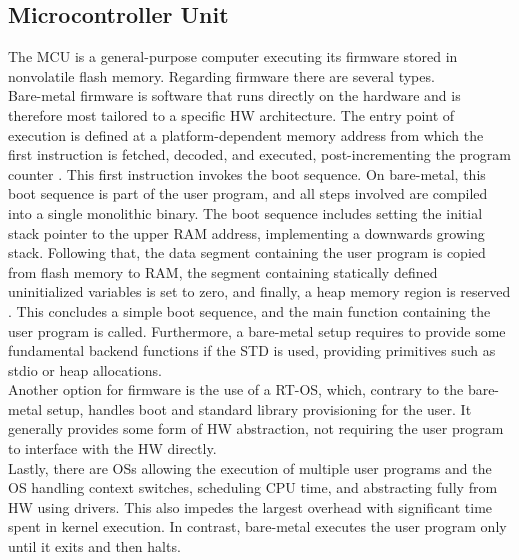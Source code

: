 \documentclass[english]{tudscrartcl}
\begin{document}
		\subsection{Microcontroller Unit}
			\label{sec:bg_mcu}
			The \ac{MCU} is a general-purpose computer executing its firmware stored in nonvolatile flash memory.
			Regarding firmware there are several types.
			\\
			Bare-metal firmware is software that runs directly on the hardware and is therefore most tailored to a specific \ac{HW} architecture.
			The entry point of execution is defined at a platform-dependent memory address from which the first instruction is fetched, decoded, and executed, post-incrementing the program counter \cite{tanenbaum2016structured}.
			This first instruction invokes the boot sequence.
			On bare-metal, this boot sequence is part of the user program, and all steps involved are compiled into a single monolithic binary.
			The boot sequence includes setting the initial stack pointer to the upper \ac{RAM} address, implementing a downwards growing stack.
			Following that, the data segment containing the user program is copied from flash memory to \ac{RAM}, the segment containing statically defined uninitialized variables is set to zero, and finally, a heap memory region is reserved \cite{ARMBMBASICS}.
			This concludes a simple boot sequence, and the main function containing the user program is called.
			Furthermore, a bare-metal setup requires to provide some fundamental backend functions if the \ac{STD} is used, providing primitives such as stdio or heap allocations.
			\\
			Another option for firmware is the use of a \ac{RT-OS}, which, contrary to the bare-metal setup, handles boot and standard library provisioning for the user. It generally provides some form of \ac{HW} abstraction, not requiring the user program to interface with the \ac{HW} directly.
			\\
			Lastly, there are \acp{OS} allowing the execution of multiple user programs and the OS handling context switches, scheduling \ac{CPU} time, and abstracting fully from \ac{HW} using drivers.
			This also impedes the largest overhead with significant time spent in kernel execution.
			In contrast, bare-metal executes the user program only until it exits and then halts.
			\\
\end{document}
